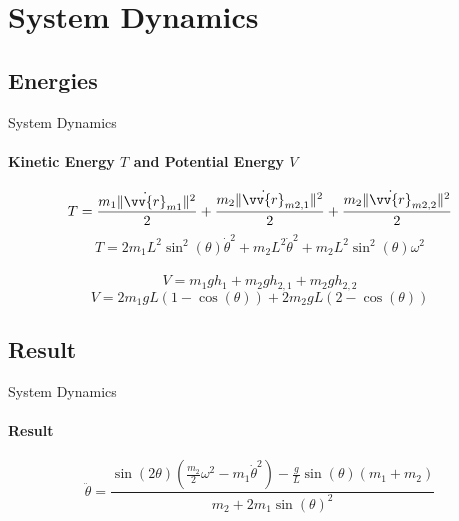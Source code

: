 \section{System Dynamics}
\subsection{Energies}
\begin{frame}{System Dynamics}
	\framesubtitle{Kinetic Energy $T$ and Potential Energy $V$}
	\begin{equation*}
		T = \frac{m_1\|\dot{\vv{r}}_{m1}\|^2}{2} + \frac{m_2\|\dot{\vv{r}}_{m2,1}\|^2}{2} + \frac{m_2\|\dot{\vv{r}}_{m2,2}\|^2}{2}
	\end{equation*}
	\begin{equation*}
		T = 2m_1L^2\sin^2(\theta)\dot{\theta}^2 + m_2L^2\dot{\theta}^2 + m_2L^2\sin^2(\theta)\omega^2
	\end{equation*}\\

	\begin{equation*}
		V = m_1gh_1 + m_2gh_{2,1} + m_2gh_{2,2}
	\end{equation*}
	\begin{equation*}
		V = 2m_1gL(1-\cos(\theta)) + 2m_2gL(2-\cos(\theta))
	\end{equation*}
\end{frame}

\subsection{Result}
\begin{frame}{System Dynamics}
	\framesubtitle{Result}
	\begin{equation*}
			\ddot{\theta} = \frac{\sin(2\theta)(\frac{m_2}{2}\omega^2-m_1\dot{\theta}^2) - \frac{g}{L}\sin(\theta)(m_1 + m_2)}{m_2 + 2 m_1 \sin(\theta)^2}
	\end{equation*}
\end{frame}